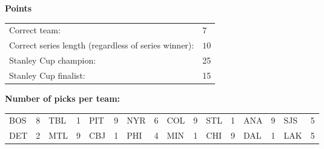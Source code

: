 \documentclass[10pt]{article}
\begin{document}
{\bf Points}\\
\begin{minipage}{12cm}
    \begin{tabular}{l l}
        Correct team:	& $7$\\
        Correct series length (regardless of series winner):	& $10$\\
        Stanley Cup champion:	& 25\\
        Stanley Cup finalist:	& 15\\
    \end{tabular}

    \vspace{1cm}
    {\bf Number of picks per team:}\\
    \begin{tabular}{lc | lc | lc | lc | lc | lc | lc | lc }
        BOS & 8 & TBL & 1 & PIT & 9 & NYR & 6 & COL & 9 & STL & 1 & ANA & 9 & SJS & 5 \\
        DET & 2 & MTL & 9 & CBJ & 1 & PHI & 4 & MIN & 1 & CHI & 9 & DAL & 1 & LAK & 5 \\
    \end{tabular}
\end{minipage}
\end{document}
